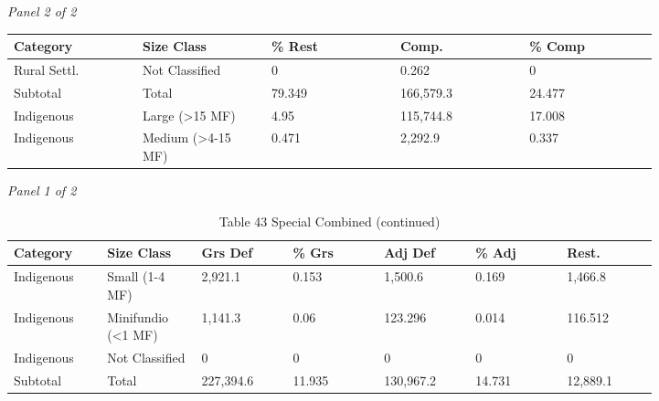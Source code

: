 \documentclass[12pt]{article}
\begin{document}
\begin{landscape}
\begin{table}[H]
\textit{Panel 2 of 2}\\[2pt]
{\fontsize{12}{14}\selectfont
\setlength{\tabcolsep}{3pt}
\renewcommand{\arraystretch}{1.08}
\begin{tabular}{p{0.164\linewidth}p{0.164\linewidth}p{0.164\linewidth}p{0.164\linewidth}p{0.164\linewidth}}
\toprule
Category & Size Class & \% Rest & Comp. & \% Comp \\
\midrule
Rural Settl. & Not Classified & 0 & 0.262 & 0 \\
Subtotal & Total & 79.349 & 166,579.3 & 24.477 \\
Indigenous & Large (>15 MF) & 4.95 & 115,744.8 & 17.008 \\
Indigenous & Medium (>4-15 MF) & 0.471 & 2,292.9 & 0.337 \\
\bottomrule
\end{tabular}
}
\end{table}
\begin{table}[H]
\centering
\caption{Table 43 Special Combined (continued)}
\textit{Panel 1 of 2}\\[2pt]
{\fontsize{12}{14}\selectfont
\setlength{\tabcolsep}{3pt}
\renewcommand{\arraystretch}{1.08}
\begin{tabular}{p{0.117\linewidth}p{0.117\linewidth}p{0.117\linewidth}p{0.117\linewidth}p{0.117\linewidth}p{0.117\linewidth}p{0.117\linewidth}}
\toprule
Category & Size Class & Grs Def & \% Grs & Adj Def & \% Adj & Rest. \\
\midrule
Indigenous & Small (1-4 MF) & 2,921.1 & 0.153 & 1,500.6 & 0.169 & 1,466.8 \\
Indigenous & Minifundio (<1 MF) & 1,141.3 & 0.06 & 123.296 & 0.014 & 116.512 \\
Indigenous & Not Classified & 0 & 0 & 0 & 0 & 0 \\
Subtotal & Total & 227,394.6 & 11.935 & 130,967.2 & 14.731 & 12,889.1 \\
\bottomrule
\end{tabular}
}

\vspace{0.6em}


\end{table}
\end{landscape}
\end{document}
